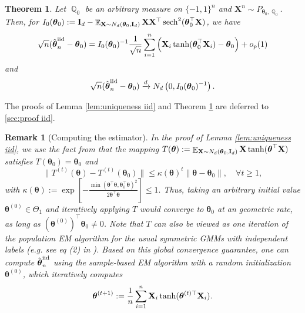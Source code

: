 \documentclass[preprint,reqno]{imsart}
\newtheorem{thm}{Theorem}[section]
\newtheorem{remark}{Remark}[section]
\newcommand{\ttheta}{\boldsymbol{\theta}}
\newcommand{\I}{\mathbf{I}_{\mathnormal{d}}}
\DeclareMathOperator{\sech}{sech}
\DeclareMathOperator{\EE}{\mathbb{E}}
\DeclareMathOperator{\QQ}{\mathbb{Q}}
\newcommand{\X}{\mathbf{X}}
\DeclareMathOperator{\sumin}{\sum_{\mathnormal i=1}^{\mathnormal n}}
\newcommand{\thetaiid}{\hat{\boldsymbol \theta}^{\text{iid}}_{\mathnormal n}}
\begin{document}
\begin{thm}\label{thm:upper bound iid}
Let $\QQ_0$ be an arbitrary measure on $\{-1, 1\}^n$ and $\X^n \sim P_{\ttheta_0,\QQ_{0}}$. Then, for $I_0(\ttheta_0) := \I - \EE_{\X\sim N_d(\ttheta_0, \I)} \X\X^{\top} \sech^2(\ttheta_0^\top \X)$, we have
\begin{equation}\label{eq:high tmp iid estimator expansion}
    \sqrt{n}(\thetaiid - \ttheta_0) = I_0(\ttheta_0)^{-1} \frac{1}{\sqrt{n}} \sumin \left(\X_i \tanh(\ttheta_0^\top \X_i) - \ttheta_0 \right) + o_p(1)
\end{equation}
and
%
    \begin{align*}%
    \sqrt{n} (\thetaiid - \ttheta_0) \xrightarrow{d} N_d\left(0, I_0(\ttheta_0)^{-1} \right) .
    \end{align*}
\end{thm}

The proofs of Lemma \ref{lem:uniqueness iid} and Theorem \ref{thm:upper bound iid} are deferred to \cref{sec:proof iid}. 
%

\begin{remark}[Computing the estimator]
    In the proof of Lemma \ref{lem:uniqueness iid}, we use the fact from \cite{daskalakis2017ten} that the mapping $T(\ttheta) := \EE_{\X\sim N_d(\ttheta_0, \I)} \X \tanh(\ttheta^\top \X)$ satisfies $T(\ttheta_0) = \ttheta_0$ and 
    $$\|T^{(t)}(\ttheta) - T^{(t)}(\ttheta_0)\| \le \kappa(\ttheta)^t \|\ttheta- \ttheta_0\|, \quad \forall t \ge 1,$$
    with $\kappa(\ttheta) := \exp\left[ - \frac{\min(\ttheta^\top \ttheta, \ttheta_0^\top \ttheta)^2}{2 \ttheta^\top \ttheta} \right] \le 1.$
    Thus, taking an arbitrary initial value $\ttheta^{(0)}\in \Theta_1$ and iteratively applying $T$ would converge to $\ttheta_0$ at an geometric rate, as long as $(\ttheta^{(0)})^\top \ttheta_0 \neq 0$. Note that $T$ can also be viewed as one iteration of the population EM algorithm for the usual symmetric GMMs with independent labels (e.g. see eq (2) in \cite{daskalakis2017ten}). Based on this global convergence guarantee, one can compute $\thetaiid$ using the sample-based EM algorithm with a random initialization $\ttheta^{(0)}$, which iteratively computes
    $$\ttheta^{(t+1)} := \frac{1}{n} \sumin \X_i \tanh(\ttheta^{(t) \top} \X_i).$$
    

    
\end{remark}

%
%
%
%
%
\end{document}
